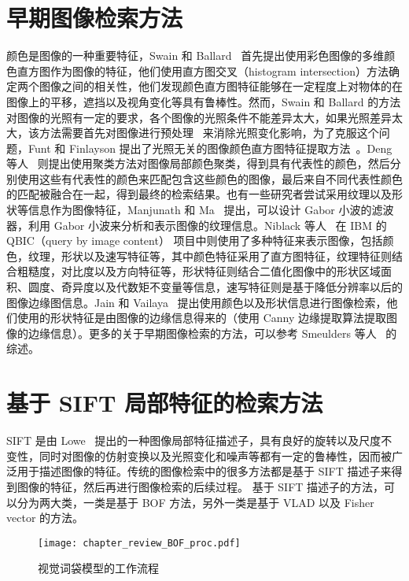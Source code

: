 \section{早期图像检索方法}\label{sec:early_work_review}

颜色是图像的一种重要特征，Swain 和 Ballard~\cite{Swain1991ColorI} 首先提出使用彩色图像的多维颜色直方图作为图像的特征，他们使用直方图交叉（histogram intersection）方法确定两个图像之间的相关性，他们发现颜色直方图特征能够在一定程度上对物体的在图像上的平移，遮挡以及视角变化等具有鲁棒性。然而，Swain 和 Ballard 的方法对图像的光照有一定的要求，各个图像的光照条件不能差异太大，如果光照差异太大，该方法需要首先对图像进行预处理~\cite{Forsyth1990ANA} 来消除光照变化影响，为了克服这个问题，Funt 和 Finlayson 提出了光照无关的图像颜色直方图特征提取方法~\cite{Funt1995ColorCC}。Deng 等人~\cite{Deng2001AnEC} 则提出使用聚类方法对图像局部颜色聚类，得到具有代表性的颜色，然后分别使用这些有代表性的颜色来匹配包含这些颜色的图像，最后来自不同代表性颜色的匹配被融合在一起，得到最终的检索结果。也有一些研究者尝试采用纹理以及形状等信息作为图像特征，Manjunath 和 Ma~\cite{Manjunath1996TextureFF} 提出，可以设计 Gabor 小波的滤波器，利用 Gabor 小波来分析和表示图像的纹理信息。Niblack 等人~\cite{Niblack1993TheQP} 在 IBM 的 QBIC（query by image content） 项目中则使用了多种特征来表示图像，包括颜色，纹理，形状以及速写特征等，其中颜色特征采用了直方图特征，纹理特征则结合粗糙度，对比度以及方向特征等，形状特征则结合二值化图像中的形状区域面积、圆度、奇异度以及代数矩不变量等信息，速写特征则是基于降低分辨率以后的图像边缘图信息。Jain 和 Vailaya~\cite{Jain1996ImageRU} 提出使用颜色以及形状信息进行图像检索，他们使用的形状特征是由图像的边缘信息得来的（使用 Canny 边缘提取算法提取图像的边缘信息）。更多的关于早期图像检索的方法，可以参考 Smeulders 等人~\cite{Smeulders2000ContentBasedIR} 的综述。


\section{基于 SIFT 局部特征的检索方法}\label{sec:sift_based_method_review}

SIFT 是由 Lowe~\cite{Lowe2004DistinctiveIF} 提出的一种图像局部特征描述子，具有良好的旋转以及尺度不变性，同时对图像的仿射变换以及光照变化和噪声等都有一定的鲁棒性，因而被广泛用于描述图像的特征。传统的图像检索中的很多方法都是基于 SIFT 描述子来得到图像的特征，然后再进行图像检索的后续过程。 基于 SIFT 描述子的方法，可以分为两大类，一类是基于 BOF 方法，另外一类是基于 VLAD 以及 Fisher vector 的方法。

\begin{figure}[!t]
\centering
\texttt{[image: chapter\_review\_BOF\_proc.pdf]}
\caption{视觉词袋模型的工作流程}
\label{fig:bof_process}
\end{figure}

